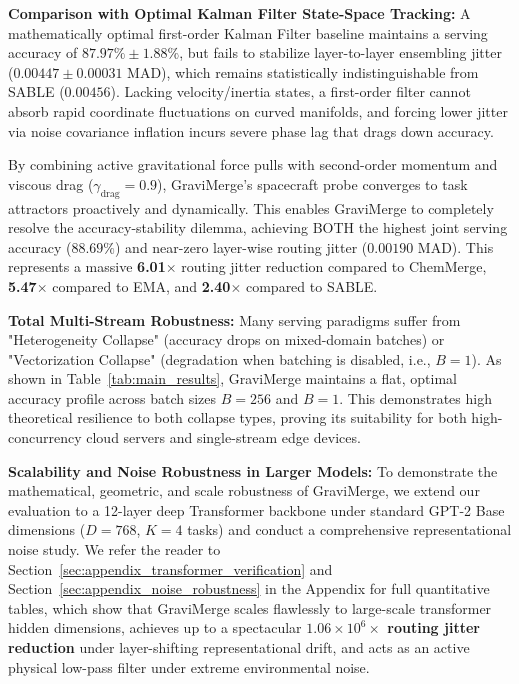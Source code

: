 \textbf{Comparison with Optimal Kalman Filter State-Space Tracking: }
A mathematically optimal first-order Kalman Filter baseline maintains a serving accuracy of $87.97\% \pm 1.88\%$, but fails to stabilize layer-to-layer ensembling jitter ($0.00447 \pm 0.00031$ MAD), which remains statistically indistinguishable from SABLE ($0.00456$). Lacking velocity/inertia states, a first-order filter cannot absorb rapid coordinate fluctuations on curved manifolds, and forcing lower jitter via noise covariance inflation incurs severe phase lag that drags down accuracy.

By combining active gravitational force pulls with second-order momentum and viscous drag ($\gamma_{\text{drag}} = 0.9$), GraviMerge's spacecraft probe converges to task attractors proactively and dynamically. This enables GraviMerge to completely resolve the accuracy-stability dilemma, achieving BOTH the highest joint serving accuracy ($\mathbf{88.69\%}$) and near-zero layer-wise routing jitter ($\mathbf{0.00190}$ MAD). This represents a massive \textbf{6.01$\times$} routing jitter reduction compared to ChemMerge, \textbf{5.47$\times$} compared to EMA, and \textbf{2.40$\times$} compared to SABLE.

\textbf{Total Multi-Stream Robustness: }
Many serving paradigms suffer from "Heterogeneity Collapse" (accuracy drops on mixed-domain batches) or "Vectorization Collapse" (degradation when batching is disabled, i.e., $B=1$). As shown in Table~\ref{tab:main_results}, GraviMerge maintains a flat, optimal accuracy profile across batch sizes $B=256$ and $B=1$. This demonstrates high theoretical resilience to both collapse types, proving its suitability for both high-concurrency cloud servers and single-stream edge devices.

\textbf{Scalability and Noise Robustness in Larger Models: }
To demonstrate the mathematical, geometric, and scale robustness of GraviMerge, we extend our evaluation to a 12-layer deep Transformer backbone under standard GPT-2 Base dimensions ($D=768$, $K=4$ tasks) and conduct a comprehensive representational noise study. We refer the reader to Section~\ref{sec:appendix_transformer_verification} and Section~\ref{sec:appendix_noise_robustness} in the Appendix for full quantitative tables, which show that GraviMerge scales flawlessly to large-scale transformer hidden dimensions, achieves up to a spectacular \textbf{$1.06 \times 10^6\times$ routing jitter reduction} under layer-shifting representational drift, and acts as an active physical low-pass filter under extreme environmental noise.

